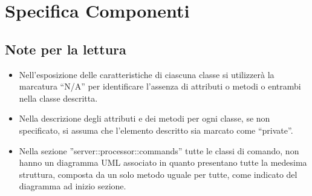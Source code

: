%
%


\section{Specifica Componenti} %
\label{sec:specifica_componenti}

	\subsection{Note per la lettura} %
	\label{sub:note_specifica}
	\begin{itemize}
		\item Nell'esposizione delle caratteristiche di ciascuna classe si utilizzerà la marcatura ``N/A'' per identificare l'assenza di attributi o metodi o entrambi nella classe descritta.
		\item Nella descrizione degli attributi e dei metodi per ogni classe, se non specificato, si assuma che l'elemento descritto sia marcato come ``private''.
		\item Nella sezione ''server::processor::commands'' tutte le classi di comando, non hanno un diagramma UML associato in quanto presentano tutte la medesima struttura, composta da un solo metodo uguale per tutte, come indicato del diagramma ad inizio sezione.
	\end{itemize}

	\clearpage \newpage
	 \clearpage \newpage
	 \clearpage \newpage
	 \clearpage \newpage
